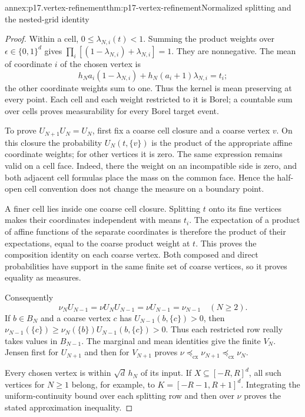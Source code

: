 \begin{annexitem}{annex:p17.vertex-refinement}{thm:p17-vertex-refinement}{Normalized splitting and the nested-grid identity}
\begin{proof}
Within a cell, \(0\leq\lambda_{N,i}(t)<1\).
Summing the product weights over \(\epsilon\in\{0,1\}^d\) gives
\(\prod_i[(1-\lambda_{N,i})+\lambda_{N,i}]=1\).
They are nonnegative. The mean of coordinate \(i\) of the chosen
vertex is
\[
      h_Na_i(1-\lambda_{N,i})
        +h_N(a_i+1)\lambda_{N,i}=t_i;
\]
the other coordinate weights sum to one. Thus the kernel is mean
preserving at every point. Each cell and each weight restricted to it
is Borel; a countable sum over cells proves measurability for every
Borel target event.

To prove \(U_{N+1}U_N=U_N\), first fix a coarse cell closure and a
coarse vertex \(v\). On this closure the probability \(U_N(t,\{v\})\)
is the product of the appropriate affine coordinate weights; for
other vertices it is zero. The same expression remains valid on a
cell face. Indeed, there the weight on an incompatible side is zero,
and both adjacent cell formulas place the mass on the common face.
Hence the half-open cell convention does not change the measure
on a boundary point.

A finer cell lies inside one coarse cell closure. Splitting \(t\)
onto its fine vertices makes their coordinates independent with
means \(t_i\). The expectation of a product of affine functions of
the separate coordinates is therefore the product of their
expectations, equal to the coarse product weight at \(t\).
This proves the composition identity on each coarse vertex.
Both composed and direct probabilities have support in the same
finite set of coarse vertices, so it proves equality as measures.

Consequently
\[
                   \nu_NU_{N-1}
                     =\nu U_NU_{N-1}
                     =\nu U_{N-1}=\nu_{N-1}\quad(N\geq2).
\]
If \(b\in B_N\) and a coarse vertex \(c\) has
\(U_{N-1}(b,\{c\})>0\), then
\(\nu_{N-1}(\{c\})\geq\nu_N(\{b\})U_{N-1}(b,\{c\})>0\).
Thus each restricted row really takes values in \(B_{N-1}\).
The marginal and mean identities give the finite \(V_N\).
Jensen first for \(U_{N+1}\) and then for \(V_{N+1}\) proves
\(\nu\preceq_{\mathrm{cx}}\nu_{N+1}\preceq_{\mathrm{cx}}\nu_N\).

Every chosen vertex is within \(\sqrt d\,h_N\) of its input.
If \(X\subseteq[-R,R]^d\), all such vertices for \(N\geq1\)
belong, for example, to \(K=[-R-1,R+1]^d\).
Integrating the uniform-continuity bound over each splitting row
and then over \(\nu\) proves the stated approximation inequality.
\end{proof}
\end{annexitem}

